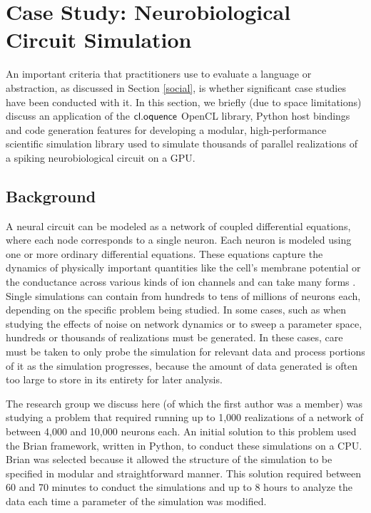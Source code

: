 \documentclass[10pt, conference, compsocconf]{IEEEtran}
\begin{document}
\section{Case Study: Neurobiological Circuit Simulation}
An important criteria that practitioners use to evaluate a language or abstraction, as discussed in Section \ref{social}, is whether significant case studies have been conducted with it. In this section, we briefly (due to space limitations) discuss an application of the $\textsf{cl.oquence}$ OpenCL library, Python host bindings and code generation features for developing a modular, high-performance scientific simulation library used to simulate  thousands of parallel realizations of a spiking neurobiological circuit on a GPU.

\subsection{Background}
A neural circuit can be modeled as a network of coupled differential equations, where each node corresponds to a single neuron. Each neuron is modeled using one or more ordinary differential equations. These equations capture the dynamics of physically important quantities like the cell's membrane potential or the conductance across various kinds of ion channels and can take many forms \cite{neurobook}. Single simulations can contain from hundreds to tens of millions of neurons each, depending on the specific problem being studied. In some cases, such as when studying the effects of noise on network dynamics or to sweep a parameter space, hundreds or thousands of realizations must be generated. In these cases, care must be taken to only probe the simulation for relevant data and process portions of it as the simulation progresses, because the amount of data generated is often too large to store in its entirety for later analysis.

The research group we discuss here (of which the first author was a member) was studying a problem that required running up to 1,000 realizations of a network of between 4,000 and 10,000 neurons each. An initial solution to this problem used the Brian framework, written in Python, to conduct these simulations on a CPU. Brian was selected because it allowed the structure of the  simulation to be specified in modular and straightforward manner. This solution required between 60 and 70 minutes to conduct the simulations and up to 8 hours to analyze the data each time a parameter of the simulation was modified.
\end{document}

